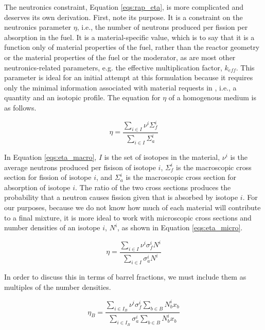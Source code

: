 The neutronics constraint, Equation \ref{eqs:rap_eta}, is more complicated and
deserves its own derivation. First, note its purpose. It is a constraint on the
neutronics parameter $\eta$, i.e., the number of neutrons produced per fission
per absorption in the fuel. It is a material-specific value, which is to say
that it is a function only of material properties of the fuel, rather than the
reactor geometry or the material properties of the fuel or the moderator, as are
most other neutronics-related parameters, e.g. the effective multiplication
factor, $k_{eff}$. This parameter is ideal for an initial attempt at this
formulation because it requires only the minimal information associated with
material requests in \Cyclus, i.e., a quantity and an isotopic profile. The
equation for $\eta$ of a homogenous medium is as follows.

\begin{equation}
\label{eqs:eta_macro}
\eta = \frac{\sum_{i \in I} \nu^{i} \Sigma_{f}^{i}}
            {\sum_{i \in I} \Sigma_{a}^{i}}
\end{equation}

In Equation \ref{eqs:eta_macro}, $I$ is the set of isotopes in the material,
$\nu^{i}$ is the average neutrons produced per fisison of isotope $i$,
$\Sigma_{f}^{i}$ is the macroscopic cross section for fission of isotope $i$,
and $\Sigma_{a}^{i}$ is the macroscopic cross section for absorption of isotope
$i$. The ratio of the two cross sections produces the probability that a neutron
causes fission given that is absorbed by isotope $i$. For our purposes, because
we do not know how much of each material will contribute to a final mixture, it
is more ideal to work with microscopic cross sections and number densities of an
isotope $i$, $N^{i}$, as shown in Equation \ref{eqs:eta_micro}.

\begin{equation}
\label{eqs:eta_micro}
\eta = \frac{\sum_{i \in I} \nu^{i} \sigma_{f}^{i} N^{i}}
            {\sum_{i \in I} \sigma_{a}^{i} N^{i}}
\end{equation}

In order to discuss this in terms of barrel fractions, we must include them as
multiples of the number densities. 

\begin{equation}
\label{eqs:eta_fractions_nonlin}
\eta_{B} = \frac{\sum_{i \in I_{B}} \nu^{i} \sigma_{f}^{i} \sum_{b \in B} N_{b}^{i} x_{b}}
                {\sum_{i \in I_{B}} \sigma_{a}^{i} \sum_{b \in B} N_{b}^{i} x_{b}}
\end{equation}

